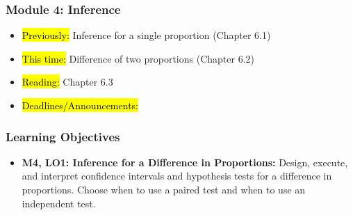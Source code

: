 
\begin{frame}
    \frametitle{Module 4: Inference}
    \begin{itemize}
        \item \hl{Previously: }Inference for a single proportion (Chapter 6.1)
        \item \hl{This time: }Difference of two proportions (Chapter 6.2)
        \item \hl{Reading: }Chapter 6.3
        \item \hl{Deadlines/Announcements: }
    \end{itemize}

\end{frame}

\begin{frame}
    \frametitle{Learning Objectives}
    \begin{itemize}
        \item \textbf{M4, LO1: Inference for a Difference in Proportions:} Design, execute, and interpret confidence intervals and hypothesis tests for a difference in proportions. Choose when to use a paired test and when to use an independent test.
    \end{itemize}
\end{frame}
